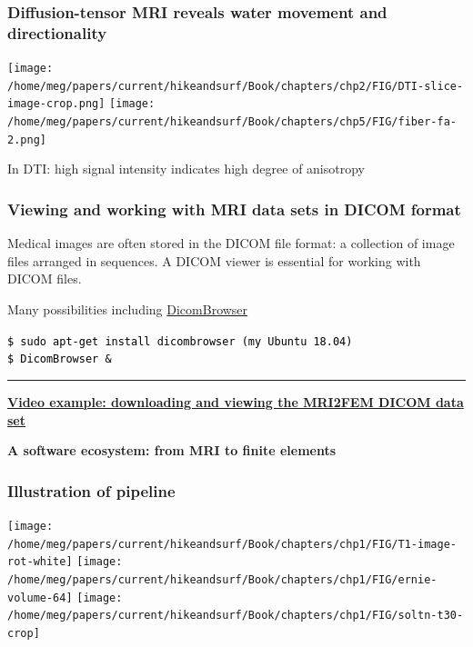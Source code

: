 \documentclass[mathserif, aspectratio=169]{beamer}
\newcommand{\mysection}[1]{\begin{frame} \begin{center} \vspace{3em} \textbf{#1} \end{center} \end{frame}}
\newcommand{\videosection}[2]{\begin{frame} \begin{center} \vspace{3em} \href{#2}{\textcolor{rognesred}{\textbf{#1}}} \end{center} \end{frame}}
\def\formtmpX#1#2{{\vskip3pt\noindent\fboxsep=0pt{\parbox{\textwidth}{\hbox to \textwidth{\hskip3pt\vbox{\raggedright\noindent\textbf{#2\vphantom{Qy}}}\hfill}}}\vskip3pt\par
\noindent\kern0pt}}
\newenvironment{programcode}[1]{\ignorespaces\def\stmtopen##1{##1}%
\formtmpX{programcode}{\centerline{\small{#1}}}}{\noindent\textcolor{programcode}{\rule{\columnwidth}{0pt}}\par\addvspace{\baselineskip}}%
\newcommand{\terminal}[1]{
  \vspace{-1em}
  \begin{programcode}{}%
    \colorbox{blue!10}{\parbox{0.98\textwidth}{\textcolor{black}{\texttt{#1}}}}
  \end{programcode}
  \vspace{-0.5em}
}
\begin{document}
\begin{frame}
  \frametitle{Diffusion-tensor MRI reveals water movement and directionality}
  \begin{center}
  \texttt{[image: /home/meg/papers/current/hikeandsurf/Book/chapters/chp2/FIG/DTI-slice-image-crop.png]}
  \hspace{2em}
  \texttt{[image: /home/meg/papers/current/hikeandsurf/Book/chapters/chp5/FIG/fiber-fa-2.png]}
  \end{center}
  In DTI: high signal intensity indicates high degree of anisotropy 
\end{frame}

\begin{frame}
  \frametitle{Viewing and working with MRI data sets in DICOM format}

  Medical images are often stored in the DICOM file format: a
  collection of image files arranged in sequences. A DICOM viewer is
  essential for working with DICOM files.

  \bigskip
  
  Many possibilities including \href{https://wiki.xnat.org/xnat-tools/dicombrowser}{DicomBrowser}

  \bigskip
  
  \terminal{\$ sudo apt-get install dicombrowser \hfill(my Ubuntu 18.04)\\
  \$ DicomBrowser \&}
\end{frame}

\videosection{Video example: downloading and viewing the MRI2FEM DICOM data set}{http://zenodo.org}

\mysection{A software ecosystem: from MRI to finite elements}

\begin{frame}
\frametitle{Illustration of pipeline}

  \begin{center}
  \texttt{[image: /home/meg/papers/current/hikeandsurf/Book/chapters/chp1/FIG/T1-image-rot-white]}
  \texttt{[image: /home/meg/papers/current/hikeandsurf/Book/chapters/chp1/FIG/ernie-volume-64]}
  \texttt{[image: /home/meg/papers/current/hikeandsurf/Book/chapters/chp1/FIG/soltn-t30-crop]}
  \end{center}

\end{frame}
\end{document}
